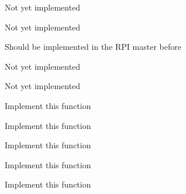 
\begin{DoxyRefList}
\item[\label{todo__todo000002}%
\hypertarget{todo__todo000002}{}%
Member \hyperlink{_command_processor_8h_ab44ed89a60c5bb25c357ce8c3eee91e1}{C\-M\-D\-\_\-\-G\-O} ]Not yet implemented  
\item[\label{todo__todo000001}%
\hypertarget{todo__todo000001}{}%
Member \hyperlink{_command_processor_8h_a775f86e197716388e422fbb58dca826f}{C\-M\-D\-\_\-\-P\-A\-R\-A\-M\-E\-T\-E\-R} ]Not yet implemented  
\item[\label{todo__todo000003}%
\hypertarget{todo__todo000003}{}%
Member \hyperlink{_command_processor_8h_a0a838d0ab7a3cc09b5b9ea002198f36c}{C\-M\-D\-\_\-\-R\-E\-Q\-U\-E\-S\-T} ]Should be implemented in the R\-P\-I master before 

Not yet implemented 

Not yet implemented  
\item[\label{todo__todo000008}%
\hypertarget{todo__todo000008}{}%
Member \hyperlink{_meditech___chip_kit_control_panel_8pde_a40ac0af2d0c4437faa8aebff8336b19b}{set\-Body\-Temp\-Status} (int start\-Char)]Implement this function  
\item[\label{todo__todo000006}%
\hypertarget{todo__todo000006}{}%
Member \hyperlink{_meditech___chip_kit_control_panel_8pde_affc4e4b28b2554dffef9ef55fc1f23a4}{set\-E\-C\-G\-Status} (int start\-Char)]Implement this function  
\item[\label{todo__todo000009}%
\hypertarget{todo__todo000009}{}%
Member \hyperlink{_meditech___chip_kit_control_panel_8pde_aac2c481fecf0a8b7db0babe49a27d1ea}{set\-Heart\-Beat\-Status} (int start\-Char)]Implement this function  
\item[\label{todo__todo000007}%
\hypertarget{todo__todo000007}{}%
Member \hyperlink{_meditech___chip_kit_control_panel_8pde_a962bcf9caf0e8d607a561a6e45c1d4cf}{set\-Pressure\-Status} (int start\-Char)]Implement this function  
\item[\label{todo__todo000005}%
\hypertarget{todo__todo000005}{}%
Member \hyperlink{_meditech___chip_kit_control_panel_8pde_af1fb1c240965fd8ff8ad7ecf88651a0d}{set\-Stethoscope\-Status} (int start\-Char)]Implement this function 
\end{DoxyRefList}